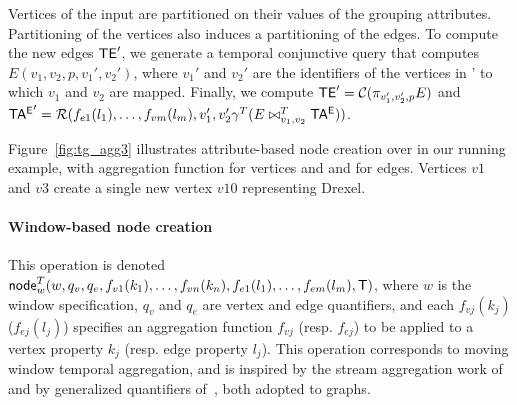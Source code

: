 Vertices of the input are partitioned on their values of the grouping
attributes.  Partitioning of the vertices also induces a partitioning
of the edges. To compute the new edges $\textsf{TE}'$, we generate a temporal
conjunctive query that computes $E(v_1,v_2,p,v_1',v_2')$, where $v_1'$
and $v_2'$ are the identifiers of the vertices in \tv' to which $v_1$
and $v_2$ are mapped.  Finally, we compute $\textsf{TE}' =
\mathcal{C}(\pi_{v_1',v_2',p}E)$ and\\ $\mathsf{TA^{E}}' =
\mathcal{R}(f_{e1}(l_1),\ldots,f_{vm}(l_m),v_1',v_2' \gamma^T (E
  \bowtie^T_{v_1,v_2} \mathsf{TA^{E}}))$.

Figure~\ref{fig:tg_agg3} illustrates attribute-based node creation
over  in our running example, with 
aggregation function for vertices and and  for edges.
Vertices $v1$ and $v3$ create a single new vertex $v10$ representing
Drexel.

\paragraph*{Window-based node creation} This operation is denoted
$\textsf{node}^T_w(w,q_v,q_e,f_{v1}(k_1),\ldots,f_{vn}(k_n),f_{e1}(l_1),\ldots,f_{em}(l_m),\mathsf{T})$,
where $w$ is the window specification, $q_v$ and $q_e$ are vertex and
edge quantifiers, and each $f_{vj}(k_j)$ ($f_{ej}(l_j)$) specifies an
aggregation function $f_{vj}$ (resp. $f_{ej}$) to be applied to a
vertex property $k_j$ (resp. edge property $l_j$).  This operation
corresponds to moving window temporal aggregation, and is inspired by
the stream aggregation work of~\cite{Li2005} and by generalized
quantifiers of~\cite{Hsu1995}, both adopted to graphs.



